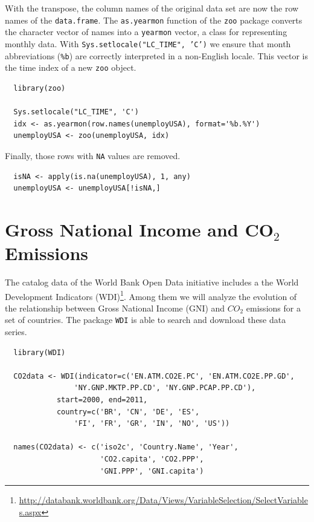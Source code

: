 \documentclass[smallroyalvopaper]{memoir}
\begin{document}
With the transpose, the column names of the original data set are
now the row names of the \texttt{data.frame}. The \texttt{as.yearmon} function
of the \texttt{zoo} package converts the character vector of names into a
\texttt{yearmon} vector, a class for representing monthly data. With
\texttt{Sys.setlocale("LC\_TIME", 'C')} we ensure that month abbreviations
(\texttt{\%b}) are correctly interpreted in a non-English locale. This
vector is the time index of a new \texttt{zoo} object. 


\lstset{language=r,label= ,caption= ,captionpos=b,numbers=none}
\begin{lstlisting}
  library(zoo)
  
  Sys.setlocale("LC_TIME", 'C')
  idx <- as.yearmon(row.names(unemployUSA), format='%b.%Y')
  unemployUSA <- zoo(unemployUSA, idx)
\end{lstlisting}

Finally, those rows with \texttt{NA} values are removed.
\lstset{language=r,label= ,caption= ,captionpos=b,numbers=none}
\begin{lstlisting}
  isNA <- apply(is.na(unemployUSA), 1, any)
  unemployUSA <- unemployUSA[!isNA,]
\end{lstlisting}

\section{Gross National Income and CO\(_{\text{2}}\) Emissions}
\label{sec:org6a96092}
The catalog data of the World Bank Open Data initiative includes a the
World Development Indicators (WDI)\footnote{\url{http://databank.worldbank.org/Data/Views/VariableSelection/SelectVariables.aspx}}. Among them we will analyze
the evolution of the relationship between Gross National Income (GNI)
and \(CO_2\) emissions for a set of countries. The package \texttt{WDI} is able
to search and download these data series.


\lstset{language=r,label= ,caption= ,captionpos=b,numbers=none}
\begin{lstlisting}
  library(WDI)
    
  CO2data <- WDI(indicator=c('EN.ATM.CO2E.PC', 'EN.ATM.CO2E.PP.GD',
                'NY.GNP.MKTP.PP.CD', 'NY.GNP.PCAP.PP.CD'),
            start=2000, end=2011,
            country=c('BR', 'CN', 'DE', 'ES',
                'FI', 'FR', 'GR', 'IN', 'NO', 'US'))

  names(CO2data) <- c('iso2c', 'Country.Name', 'Year',
                      'CO2.capita', 'CO2.PPP',
                      'GNI.PPP', 'GNI.capita')
\end{lstlisting}
\end{document}
